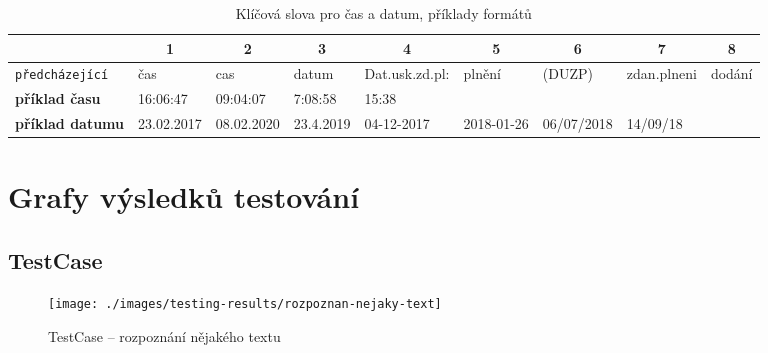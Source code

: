 \documentclass[thesis=B,czech]{FITthesis}[2019/12/23]
\def\pred{\texttt{předcházející}}
\begin{document}
{\begin{landscape}
\begin{table}[]
\begin{tabular}{|l|l|l|l|l|l|l|l|l|}
				\hline
				                        & \multicolumn{1}{c|}{\textbf{1}} & \multicolumn{1}{c|}{\textbf{2}} & \multicolumn{1}{c|}{\textbf{3}} & \multicolumn{1}{c|}{\textbf{4}} & \multicolumn{1}{c|}{\textbf{5}} & \multicolumn{1}{c|}{\textbf{6}} & \multicolumn{1}{c|}{\textbf{7}} & \multicolumn{1}{c|}{\textbf{8}} \\ \hline
				{\pred{}}               & čas                             & cas                             & datum                           & Dat.usk.zd.pl:                  & plnění                          & (DUZP)                          & zdan.plneni                     & dodání                          \\ \hline
				\textbf{příklad času}   & 16:06:47                        & 09:04:07                        & 7:08:58                         & 15:38                           &                                 &                                 &                                 &                                 \\ \hline
				\textbf{příklad datumu} & 23.02.2017                      & 08.02.2020                      & 23.4.2019                       & 04-12-2017                      & 2018-01-26                      & 06/07/2018                      & 14/09/18                        &                                 \\ \hline
			\end{tabular}
			\caption{Klíčová slova pro čas a datum, příklady formátů}
			\label{tab:time-formats}
		\end{table}
	\end{landscape}
	\clearpage%
}



\chapter{Grafy výsledků testování}
\label{chapter:graphs}

\section{TestCase}
\begin{figure}[H]
	\centering
	\texttt{[image: ./images/testing-results/rozpoznan-nejaky-text]}
	\caption{TestCase -- rozpoznání nějakého textu}
	\label{fig:testCase-rozpoznan-nejaky-text}
\end{figure}


\end{document}
